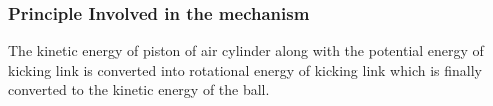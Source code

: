         \subsubsection{Principle Involved in the mechanism}
            The kinetic energy of piston of air cylinder along with the potential energy of kicking link is converted
            into rotational energy of kicking link which is finally converted to the kinetic energy of the ball.

